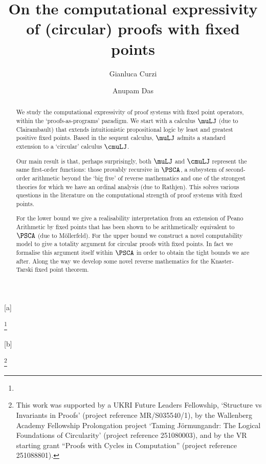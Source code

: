 \documentclass{lmcs}
\begin{document}
\title[Computational expressivity of (circular) proofs with fixed points]{On the computational expressivity of (circular) proofs with fixed points}

\author[G.~Curzi]{Gianluca Curzi}[a]
\address{University of Gothenburg and University of Birmingham}
\thanks{}

\author[A.~Das]{Anupam Das}[b]
\address{University of Birmingham}
\thanks{This work was supported by a UKRI Future Leaders Fellowship, `Structure vs Invariants in Proofs' (project reference MR/S035540/1), by the Wallenberg Academy Fellowship Prolongation 
project `Taming Jörmungandr: The Logical Foundations of Circularity' (project reference 251080003), and by the
VR starting grant ``Proofs with Cycles in Computation'' (project reference 251088801).
}

\maketitle


\begin{abstract}
We study the computational expressivity of proof systems with fixed point operators, within the `proofs-as-programs' paradigm. We start with a calculus $\muLJ$ (due to Clairambault) that extends intuitionistic propositional logic by least and greatest positive fixed points. Based in the sequent calculus, $\muLJ$ admits a standard extension to a `circular' calculus $\cmuLJ$.

Our main result is that, perhaps surprisingly, both $\muLJ$ and $\cmuLJ$ represent the same first-order functions: those provably recursive in $\PSCA$, a subsystem of second-order arithmetic beyond the `big five' of reverse mathematics and one of the strongest theories for which we have an ordinal analysis (due to Rathjen). This solves various questions in the literature on the computational strength of proof systems with fixed points.

For the lower bound we give a realisability interpretation from an extension of Peano Arithmetic by fixed points that has been shown to be arithmetically equivalent to $\PSCA$ (due to M\"ollerfeld). For the upper bound we construct a novel computability model to give a totality argument for circular proofs with fixed points. 
In fact we formalise this argument itself within $\PSCA$ in order to obtain the tight bounds we are after.
Along the way we develop some novel reverse mathematics for the Knaster-Tarski fixed point theorem.
\end{abstract}
\end{document}
